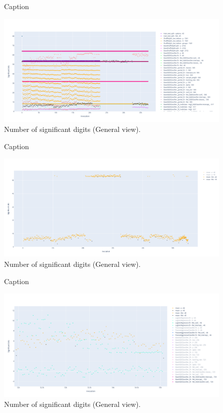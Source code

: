 \documentclass[11pt]{article}
\begin{document}
\begin{figure}
    \centering
    \caption{Caption}
    \includegraphics[width=\linewidth]{figure/classifier_comparisons/general.png}
    \caption{Number of significant digits (General view).}
    \label{fig:classifier_comparisons_general}
\end{figure}

\begin{figure}
    \centering
    \caption{Caption}
    \includegraphics[width=\linewidth]{figure/classifier_comparisons/mean_predicition_s.png}
    \caption{Number of significant digits (General view).}
    \label{fig:classifier_comparisons_mean_predictions}
\end{figure}

\begin{figure}
    \centering
    \caption{Caption}
    \includegraphics[width=\linewidth]{figure/classifier_comparisons/SAG_predicition_s.png}
    \caption{Number of significant digits (General view).}
    \label{fig:classifier_comparisons_general}
\end{figure}
\end{document}
